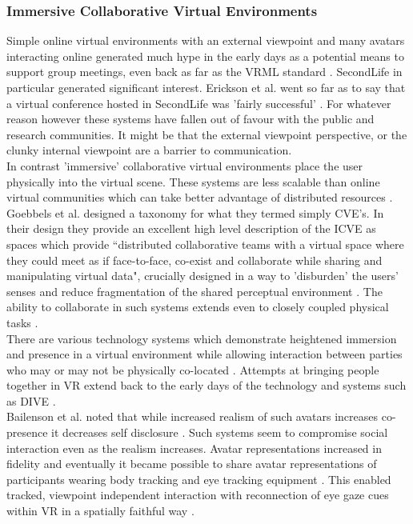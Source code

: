         \subsubsection{Immersive Collaborative Virtual Environments}
Simple online virtual environments with an external viewpoint and many avatars interacting online generated much hype in the early days as a potential means to support group meetings, even back as far as the VRML standard \cite{Ferscha1999}. SecondLife in particular generated significant interest. Erickson et al. went so far as to say that a virtual conference hosted in SecondLife was 'fairly successful' \cite{Erickson2011}. For whatever reason however these systems have fallen out of favour with the public and research communities. It might be that the external viewpoint perspective, or the clunky internal viewpoint are a barrier to communication. \\
In contrast 'immersive' collaborative virtual environments place the user physically into the virtual scene. These systems are less scalable than online virtual communities which can take better advantage of distributed resources \cite{Grimstead2005a, Benford1998}. Goebbels et al. designed a taxonomy for what they termed simply CVE's. In their design they provide an excellent high level description of the ICVE as spaces which provide ``distributed collaborative teams with a virtual space where they could meet as if face-to-face, co-exist and collaborate while sharing and manipulating virtual data", crucially designed in a way to 'disburden' the users' senses \cite{Goebbels2003} and reduce fragmentation of the shared perceptual environment \cite{Roberts2005}. The ability to collaborate in such systems extends even to closely coupled physical tasks \cite{Roberts2012}.\\
There are various technology systems which demonstrate heightened immersion and presence in a virtual environment while allowing interaction between parties who may or may not be physically co-located \cite{Murray2009a}. Attempts at bringing people together in VR extend back to the early days of the technology and systems such as DIVE \cite{Benford:1995hh}. \\
                        Bailenson et al. noted that while increased realism of such avatars increases co-presence it decreases self disclosure \cite{Bailenson2006}. Such systems seem to compromise social interaction even as the realism increases. Avatar representations increased in fidelity and eventually it became possible to share avatar representations of participants wearing body tracking \cite{Schreer2005} and eye tracking equipment \cite{Garau2001, Garau2003}. This enabled tracked, viewpoint independent interaction with reconnection of eye gaze cues within VR in a spatially faithful way \cite{Roberts2003, Murray2007, Steptoe2008, Steptoe2009, Steptoe2010b}.\\
